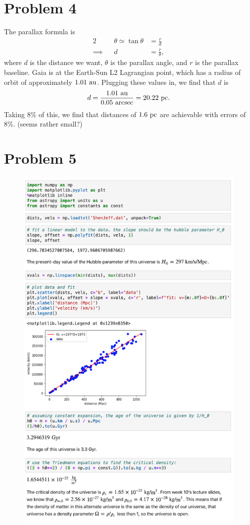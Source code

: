 \documentclass[11pt,letterpaper]{article}
\begin{document}
\section*{Problem 4}

The parallax formula is 
\begin{alignat*}{2}
    &&\theta \simeq \tan{\theta} &= \frac{r}{d} \\
    \implies&& d &= \frac{r}{\theta},
\end{alignat*}
where $d$ is the distance we want, $\theta$ is the parallax angle, and $r$ is the parallax baseline. Gaia is at the Earth-Sun L2 Lagrangian point, which has a radius of orbit of approximately $1.01~{\rm au}$. Plugging these values in, we find that $d$ is 
\begin{align*}
    d = \frac{1.01~{\rm au}}{0.05~{\rm arcsec}} = 20.22~{\rm pc}.
\end{align*}
{Taking 8\% of this, we find that distances of $1.6~{\rm pc}$ are achievable with errors of 8\%. {\tiny(seems rather small?)}}

\newpage

\section*{Problem 5}

\begin{figure}[!htbp]
    \centering
    \includegraphics[width=0.78\linewidth]{q5.png}
\end{figure}
\end{document}
